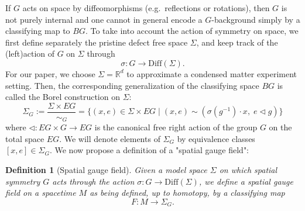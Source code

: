 \documentclass[aps,prx,reprint,superscriptaddress,twocolumn,amsmath,amssymb,amsfonts, nofootinbib]{revtex4-2}
\theoremstyle{apsstyle}
\newtheorem{definition}[theorem]{Definition}
\begin{document}
If $G$ acts on space by diffeomorphisms (e.g.\ reflections or rotations), then $G$ is not purely internal and one cannot in general encode a $G$-background simply by a classifying map to $BG$. To take into account the action of symmetry on space, we first define separately the pristine defect free space $\Sigma$, and keep track of the (left)action of $G$ on $\Sigma$ through 
\begin{equation*}
\sigma: G \to \mathrm{Diff}(\Sigma).
\end{equation*}
For our paper, we choose $\Sigma=\mathbb{R}^{d}$ to approximate a condensed matter experiment setting. Then, the corresponding generalization of the classifying space $BG$ is called the Borel construction on $\Sigma$:
\begin{equation}
\label{eq:borel_construction}
    \Sigma_{G}:= \dfrac{\Sigma\times EG}{\sim_{G}}=\{(x, e)\in \Sigma\times EG\;|\; (x,e)\sim (\sigma(g^{-1})\cdot x,\; e\lhd g)\}
\end{equation}
where $\lhd: EG \times G\to EG$ is the canonical free right action of the group $G$ on the total space $EG$. We will denote elements of $\Sigma_{G}$ by equivalence classes $[x,e]\in \Sigma_{G}$. We now propose a definition of a "spatial gauge field":

\bigskip 

\begin{definition}[Spatial gauge field]
\label{def:sgf}
    Given a model space $\Sigma$ on which spatial symmetry $G$ acts through the action $\sigma: G\to \mathrm{Diff}(\Sigma)$, we define a spatial gauge field on a spacetime $M$ as being defined, up to homotopy, by a classifying map
    \begin{equation}
        F: M \to \Sigma_{G}.
    \end{equation}
\end{definition}

\medskip
\end{document}
